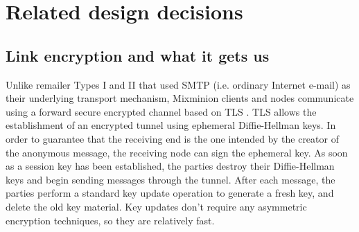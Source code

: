 \documentclass{llncs}
\begin{document}
\section{Related design decisions}


\subsection{Link encryption and what it gets us}
\label{subsec:link-encrypt}

Unlike remailer Types I and II that used SMTP \cite{SMTP} (i.e. ordinary
Internet e-mail) as their underlying transport mechanism, Mixminion
clients and nodes communicate using a forward secure encrypted channel
based on TLS \cite{TLS}.  
TLS allows the establishment of an encrypted tunnel using ephemeral
Diffie-Hellman keys. In order to guarantee that the receiving end is
the one intended by the creator of the anonymous message, the
receiving node can sign the ephemeral key. As soon as a session key
has been established, the parties destroy their Diffie-Hellman keys
and begin sending messages through the tunnel. After each message, the
parties perform a standard key update operation to generate a fresh
key, and delete the old key material.  Key updates don't require any
asymmetric encryption techniques, so they are relatively fast.

%


%
\end{document}
